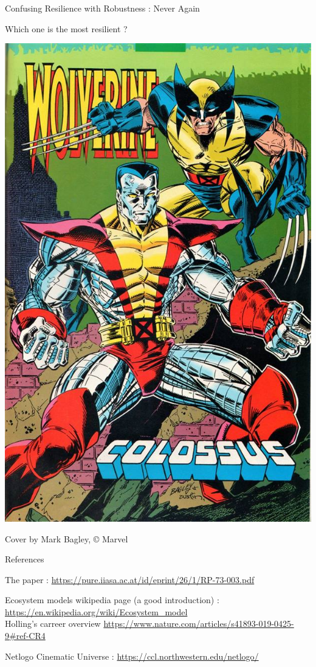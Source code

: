 \documentclass[11,aspectratio=1610]{beamer}
\begin{document}
\begin{frame}{Confusing Resilience with  Robustness : Never Again}

\centering
 Which one is the most resilient ? 

\includegraphics[height=0.8\textheight]{img/wolverine_colossus.jpg}

\tiny{Cover by Mark Bagley,  © Marvel }

\end{frame}







\begin{frame}{References}


The paper : \url{https://pure.iiasa.ac.at/id/eprint/26/1/RP-73-003.pdf}

Ecosystem models wikipedia page (a good introduction) : \url{https://en.wikipedia.org/wiki/Ecosystem_model} \\

Holling's carreer overview \url{ https://www.nature.com/articles/s41893-019-0425-9\#ref-CR4}

Netlogo Cinematic Universe : \url{https://ccl.northwestern.edu/netlogo/}


\end{frame}
\end{document}
